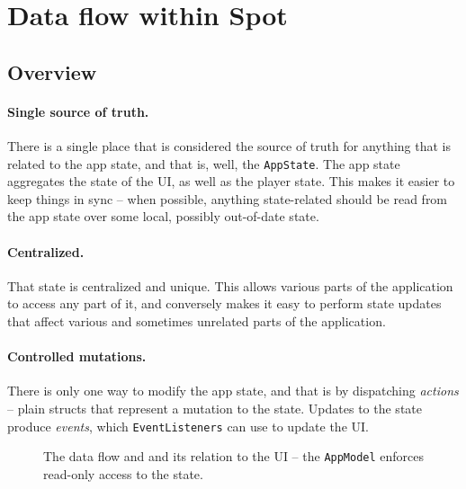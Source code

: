\documentclass[12pt, a4paper]{article}
\begin{document}
\section{Data flow within Spot}

\subsection{Overview}

\paragraph{Single source of truth.} There is a single place that is considered the source of truth for anything that is related to the app state, and that is, well, the \texttt{AppState}. The app state aggregates the state of the UI, as well as the player state. This makes it easier to keep things in sync -- when possible, anything state-related should be read from the app state over some local, possibly out-of-date state.

\paragraph{Centralized.} That state is centralized and unique. This allows various parts of the application to access any part of it, and conversely makes it easy to perform state updates that affect various and sometimes unrelated parts of the application.

\paragraph{Controlled mutations.} There is only one way to modify the app state, and that is by dispatching \emph{actions} -- plain structs that represent a mutation to the state. Updates to the state produce \emph{events}, which \texttt{EventListeners} can use to update the UI. 

\begin{figure}[!h]

    \centering
    

    \caption{The data flow and and its relation to the UI -- the \texttt{AppModel} enforces read-only access to the state.}
    \label{fig:flow}

\end{figure}
\end{document}
